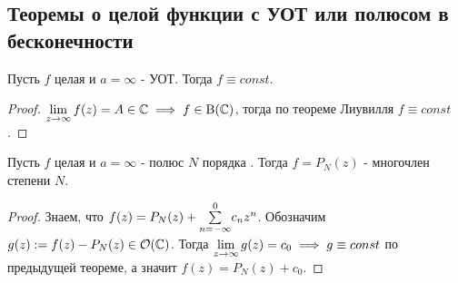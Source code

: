 \subsection{Теоремы о целой функции с УОТ или полюсом в бесконечности}
\begin{theorem}
  Пусть $f$ целая и $a=\infty$ - УОТ. Тогда $f\equiv const$. 
\end{theorem}
\begin{proof}
  $\Lim{z}{\infty}f(z)=A\in\C\implies f\in {\rm B}(\C)$, тогда по теореме Лиувилля $f\equiv const$. 
\end{proof}
\begin{theorem}
  Пусть $f$ целая и $a=\infty$ - полюс $N$ порядка . Тогда $f=P_N(z)$ - многочлен степени $N$. 
\end{theorem}
\begin{proof}
  Знаем, что $f(z) = P_N(z) + \Sum{n=-\infty}{0}c_nz^n$. Обозначим $g(z):=f(z) - P_N(z)\in\O(\C)$. Тогда $\Lim{z}{\infty}g(z) = c_0\implies g\equiv const$ по предыдущей теореме, а значит $f(z) = P_N(z) + c_0$.
\end{proof}
